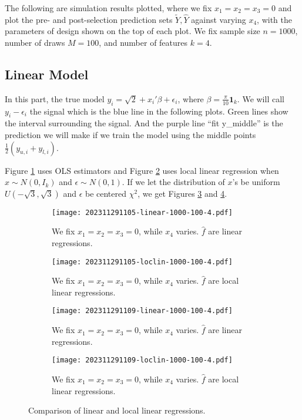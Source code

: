 \documentclass[12pt]{article}
\begin{document}
    The following are simulation results plotted, where we fix \(x_{1} = x_{2} = x_{3} = 0\) and plot the pre- and post-selection prediction sets \(\tilde{Y}, \hat{Y}\) against varying \(x_{4}\), with the parameters of design shown on the top of each plot. We fix sample size \(n = 1000\), number of draws \(M = 100\), and number of features \(k = 4\).  

    \subsection{Linear Model}

    In this part, the true model \(y_{i} = \sqrt{2} + x_{i}'\beta + \epsilon_{i}\), where \(\beta = \frac{\pi}{10} \mathbf{1}_{k}\). We will call \(y_{i} - \epsilon_{i}\) the signal which is the blue line in the following plots. Green lines show the interval surrounding the signal. And the purple line ``fit y\_middle'' is the prediction we will make if we train the model using the middle points \(\frac{1}{2}(y_{u,i} + y_{l,i})\).
    
    Figure \ref{fig:1} uses OLS estimators and Figure \ref{fig:2} uses local linear regression when \(x\sim N(0,I_{k})\) and \(\epsilon\sim N(0,1)\). If we let the distribution of \(x\)'s be uniform \(U( - \sqrt{3}, \sqrt{3})\) and \(\epsilon\) be centered \(\chi^{2}\), we get Figures \ref{fig:3} and \ref{fig:4}.

\begin{figure}[h]
    \centering
    \begin{subfigure}[b]{0.45\textwidth}
        \texttt{[image: 202311291105-linear-1000-100-4.pdf]}
        \caption{We fix \(x_{1} = x_{2} = x_{3} = 0\), while \(x_{4}\) varies. \(\hat{f}\) are linear regressions.}
        \label{fig:1}
    \end{subfigure}
    \hfill
    \begin{subfigure}[b]{0.45\textwidth}
        \texttt{[image: 202311291105-loclin-1000-100-4.pdf]}
        \caption{We fix \(x_{1} = x_{2} = x_{3} = 0\), while \(x_{4}\) varies. \(\hat{f}\) are local linear regressions.}
        \label{fig:2}
    \end{subfigure}
    \vfill
    \begin{subfigure}[b]{0.45\textwidth}
        \texttt{[image: 202311291109-linear-1000-100-4.pdf]}
        \caption{We fix \(x_{1} = x_{2} = x_{3} = 0\), while \(x_{4}\) varies. \(\hat{f}\) are linear regressions.}
        \label{fig:3}
    \end{subfigure}
    \hfill
    \begin{subfigure}[b]{0.45\textwidth}
        \texttt{[image: 202311291109-loclin-1000-100-4.pdf]}
        \caption{We fix \(x_{1} = x_{2} = x_{3} = 0\), while \(x_{4}\) varies. \(\hat{f}\) are local linear regressions.}
        \label{fig:4}
    \end{subfigure}
    \caption{Comparison of linear and local linear regressions.}
    \label{fig:comparison1}
\end{figure}
\newpage 
\end{document}

